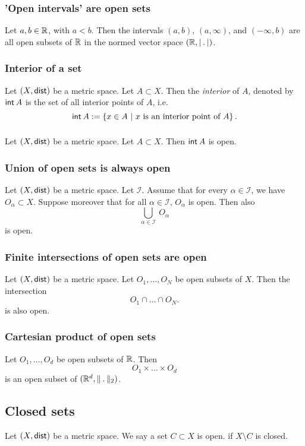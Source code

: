 \subsubsection*{'Open intervals' are open sets}
\uprop Let $a, b \in \mathbb{R}$, with $a < b$. Then the intervals $(a,b)$, $(a, \infty)$, and
$(-\infty, b)$ are all open subsets of $\mathbb{R}$ in the normed vector space
$(\R, \normR)$.

\subsubsection*{Interior of a set}
Let $(X, \mathsf{dist})$ be a metric space. Let $A \subset X$. Then the \emph{interior}
of $A$, denoted by $\setint A$ is the set of all interior points of $A$, i.e.
\[
    \setint A := \left\{ x \in A\ \middle|\ x \text{ is an interior point of } A \right\}.
\]

\subsubsection*{}
\uprop Let $(X, \mathsf{dist})$ be a metric space. Let $A \subset X$. Then $\setint A$
is open.

\subsubsection*{Union of open sets is always open}
\uthm Let $(X, \mathsf{dist})$ be a metric space. Let $\mathcal{I}$.
Assume that for every $\alpha \in \mathcal{I}$, we have $O_\alpha \subset X$.
Suppose moreover that for all $\alpha \in \mathcal{I}$, $O_\alpha$ is open.
Then also
\[
    \bigcup_{\alpha \in \mathcal{I}}\ O_\alpha
\]
is open.

\subsubsection*{Finite intersections of open sets are open}
\uprop Let $(X, \mathsf{dist})$ be a metric space. Let $O_1, \dots, O_N$ be open subsets
of $X$. Then the intersection
\[
    O_1 \cap \dots \cap O_N.
\]
is also open.

\subsubsection*{Cartesian product of open sets}
Let $O_1, \dots, O_d$ be open subsets of $\mathbb{R}$. Then
\[
    O_1 \times \dots \times O_d
\]
is an open subset of $(\R^d, \norm_2)$.

\subsection{Closed sets}
\udef Let $(X, \mathsf{dist})$ be a metric space. We say a set $C \subset X$ is open.
if $X \setminus C$ is closed.

